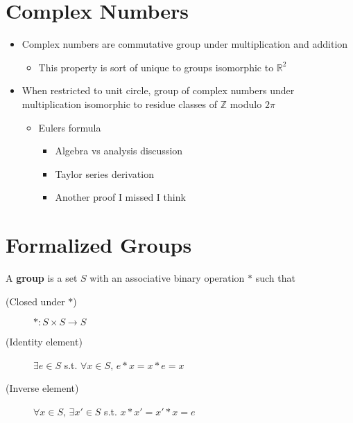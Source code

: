 \documentclass{report}
\begin{document}
\section{Complex Numbers}
\begin{itemize}
    \item Complex numbers are commutative group under multiplication and addition
    \begin{itemize}
        \item This property is sort of unique to groups isomorphic to $\mathbb{R}^2$
    \end{itemize}
    \item When restricted to unit circle, group of complex numbers under multiplication isomorphic to residue classes of $\mathbb{Z}$ modulo $2 \pi$
    \begin{itemize}
        \item Eulers formula
        \begin{itemize}
            \item Algebra vs analysis discussion
            \item Taylor series derivation
            \item Another proof I missed I think
        \end{itemize}
    \end{itemize}
\end{itemize}

\section{Formalized Groups}
\begin{definition}
    A \textbf{group} is a set $S$ with an associative binary operation $*$ such that
        \begin{description}
            \item[(Closed under $*$)] $*: S \times S \rightarrow S$
            \item[(Identity element)] $\exists e \in S$ s.t. $\forall x \in S,\, e * x = x * e = x$
            \item[(Inverse element)] $\forall x \in S, \, \exists x' \in S$ s.t. $x * x' = x' * x = e$
        \end{description}
\end{definition}
\end{document}
